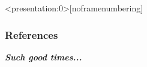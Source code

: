 \documentclass[aspectratio=169]{beamer}
\begin{document}
\begin{markdown}







\begin{frame}<presentation:0>[noframenumbering]

{\cite{salucci} \cite{Shull} \cite{cen-ostriker} \cite{tepper} \cite{savage} \cite{danforth} \cite{acharya}}
    
\end{frame}
    



\begin{frame}
\renewcommand{\bibfont}{\footnotesize}
\frametitle{\huge{\textbf{References}}}




\end{frame}


\begin{frame}{}
  \centering \Huge
  \textbf{\emph{Such good times...}}
\end{frame}


\end{markdown}
\end{document}
